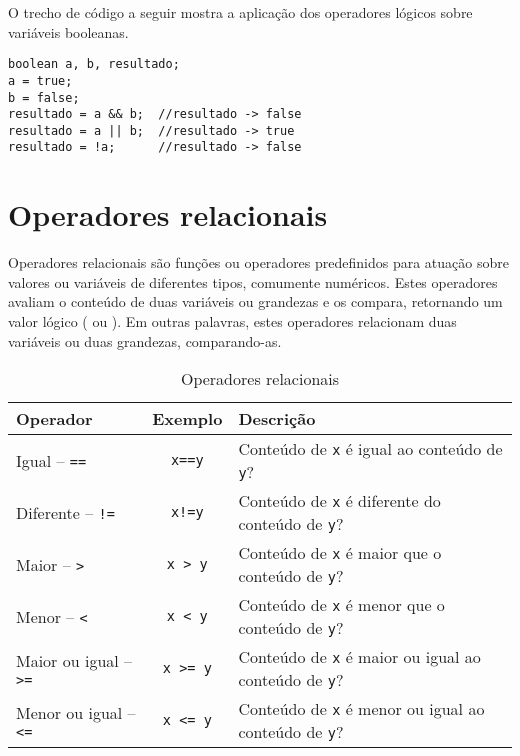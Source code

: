 O trecho de código a seguir mostra a aplicação dos operadores lógicos sobre variáveis booleanas.

\begin{verbatim}
boolean a, b, resultado;
a = true;
b = false;
resultado = a && b;  //resultado -> false
resultado = a || b;  //resultado -> true
resultado = !a;      //resultado -> false
\end{verbatim}

\section{Operadores relacionais}
Operadores relacionais são funções ou operadores predefinidos para atuação sobre valores ou variáveis de diferentes tipos, comumente numéricos. Estes operadores avaliam o conteúdo de duas variáveis ou grandezas e os compara, retornando um valor lógico ( ou ). Em outras palavras, estes operadores relacionam duas variáveis ou duas grandezas, comparando-as.

\begin{table}[H]
	\centering
	\begin{tabular}{l|c|l}
		\hline
		\textbf{Operador}       & \textbf{Exemplo}                              & \textbf{Descrição}                                       \\ \hline
		Igual -- \texttt{==}          &       \texttt{x==y}                        & Conteúdo de \texttt{x} é igual ao conteúdo de \texttt{y}?          \\
		Diferente -- \texttt{!=}      &         \texttt{x!=y}                       & Conteúdo de \texttt{x} é diferente do conteúdo de \texttt{y}?      \\
		Maior -- \texttt{>}          & \texttt{x > y} 			  & Conteúdo de \texttt{x} é maior que o conteúdo de \texttt{y}?       \\
		Menor -- \texttt{<}          & \texttt{x < y}       		  & Conteúdo de \texttt{x} é menor que o conteúdo de \texttt{y}?       \\
		Maior ou igual -- \texttt{>=} & \texttt{x >= y} & Conteúdo de \texttt{x} é maior ou igual ao conteúdo de \texttt{y}? \\
		Menor ou igual -- \texttt{<=} & \texttt{x <= y}       & Conteúdo de \texttt{x} é menor ou igual ao conteúdo de \texttt{y}? \\ \hline
	\end{tabular}
	\caption{Operadores relacionais}
\end{table}

